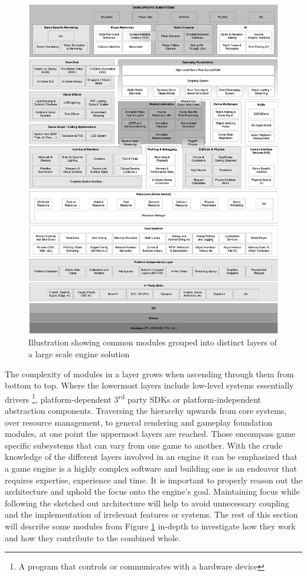 \begin{figure}[h!]
	\centering \includegraphics[width=\linewidth]{PICs/engine_runtime_arch.jpg}
	\caption{Illustration showing common modules grouped into distinct layers of a large scale engine solution}
	\label{fig:engine_runtime_arch}
\end{figure}

The complexity of modules in a layer grows when ascending through them from bottom to top. Where the lowermost layers include low-level systems essentially drivers \footnote{A program that controls or communicates with a hardware device}, platform-dependent 3\textsuperscript{rd} party \acp{SDK} or platform-independent abstraction components. Traversing the hierarchy upwards from core systems, over resource management, to general rendering and gameplay foundation modules, at one point the uppermost layers are reached. Those encompass game specific subsystems that can vary from one game to another. With the crude knowledge of the different layers involved in an engine it can be emphasized that a game engine is a highly complex software and building one is an endeavor that requires expertise, experience and time. It is important to properly reason out the architecture and uphold the focus onto the engine's goal. Maintaining focus while following the sketched out architecture will help to avoid unnecessary coupling and the implementation of irrelevant features or systems. 
The rest of this section will describe some modules from Figure \ref{fig:engine_runtime_arch} in-depth to investigate how they work and how they contribute to the combined whole.


